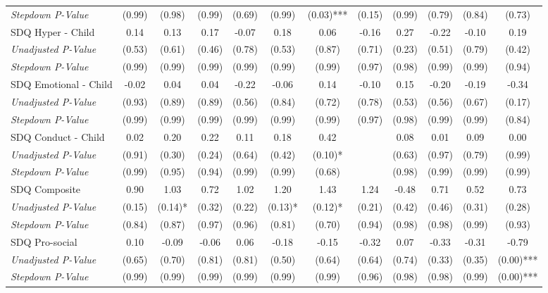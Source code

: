 \begin{tabular}{l c c c c c c c c c c c}
\quad \textit{Stepdown P-Value} & (0.99) & (0.98) & (0.99) & (0.69) & (0.99) & (0.03)*** & (0.15) & (0.99) & (0.79) & (0.84) & (0.73) \\
SDQ Hyper - Child & 0.14 & 0.13 & 0.17 & -0.07 & 0.18 & 0.06 & -0.16 & 0.27 & -0.22 & -0.10 & 0.19 \\
\quad \textit{Unadjusted P-Value} & (0.53) & (0.61) & (0.46) & (0.78) & (0.53) & (0.87) & (0.71) & (0.23) & (0.51) & (0.79) & (0.42) \\
\quad \textit{Stepdown P-Value} & (0.99) & (0.99) & (0.99) & (0.99) & (0.99) & (0.99) & (0.97) & (0.98) & (0.99) & (0.99) & (0.94) \\
SDQ Emotional - Child & -0.02 & 0.04 & 0.04 & -0.22 & -0.06 & 0.14 & -0.10 & 0.15 & -0.20 & -0.19 & -0.34 \\
\quad \textit{Unadjusted P-Value} & (0.93) & (0.89) & (0.89) & (0.56) & (0.84) & (0.72) & (0.78) & (0.53) & (0.56) & (0.67) & (0.17) \\
\quad \textit{Stepdown P-Value} & (0.99) & (0.99) & (0.99) & (0.99) & (0.99) & (0.99) & (0.97) & (0.98) & (0.99) & (0.99) & (0.84) \\
SDQ Conduct - Child & 0.02 & 0.20 & 0.22 & 0.11 & 0.18 & 0.42 &  & 0.08 & 0.01 & 0.09 & 0.00 \\
\quad \textit{Unadjusted P-Value} & (0.91) & (0.30) & (0.24) & (0.64) & (0.42) & (0.10)* & & (0.63) & (0.97) & (0.79) & (0.99) \\
\quad \textit{Stepdown P-Value} & (0.99) & (0.95) & (0.94) & (0.99) & (0.99) & (0.68) & & (0.98) & (0.99) & (0.99) & (0.99) \\
SDQ Composite & 0.90 & 1.03 & 0.72 & 1.02 & 1.20 & 1.43 & 1.24 & -0.48 & 0.71 & 0.52 & 0.73 \\
\quad \textit{Unadjusted P-Value} & (0.15) & (0.14)* & (0.32) & (0.22) & (0.13)* & (0.12)* & (0.21) & (0.42) & (0.46) & (0.31) & (0.28) \\
\quad \textit{Stepdown P-Value} & (0.84) & (0.87) & (0.97) & (0.96) & (0.81) & (0.70) & (0.94) & (0.98) & (0.98) & (0.99) & (0.93) \\
SDQ Pro-social & 0.10 & -0.09 & -0.06 & 0.06 & -0.18 & -0.15 & -0.32 & 0.07 & -0.33 & -0.31 & -0.79 \\
\quad \textit{Unadjusted P-Value} & (0.65) & (0.70) & (0.81) & (0.81) & (0.50) & (0.64) & (0.64) & (0.74) & (0.33) & (0.35) & (0.00)*** \\
\quad \textit{Stepdown P-Value} & (0.99) & (0.99) & (0.99) & (0.99) & (0.99) & (0.99) & (0.96) & (0.98) & (0.98) & (0.99) & (0.00)*** \\

\end{tabular}
